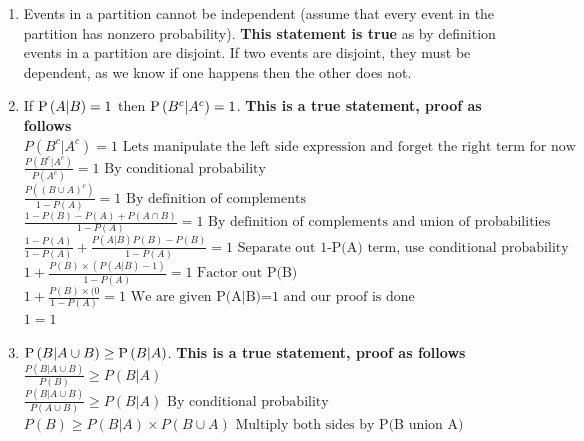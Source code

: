 \documentclass[12pt,twoside]{article}
\begin{document}
\begin{enumerate}
\begin{enumerate}
\item Events in a partition cannot be independent (assume that every event in the partition has nonzero probability). 
\subitem
\textbf{This statement is true} as by definition events in a partition are disjoint. If two events are disjoint, they must be dependent, as we know if one happens then the other does not.

\break

\item If $\mathrm{P}\left( A | B \right) = 1$ then $\mathrm{P}\left( B^c | A^c \right) = 1$. \textbf{This is a true statement, proof as follows} \\

$
P(B^c|A^c) = 1 \text{ Lets manipulate the left side expression and forget the right term for now}$ \\

$ 
 \frac{P(B^c|A^c)}{P(A^c)} = 1 \text{ By conditional probability}
$\\

$
\frac{P((B \cup A)^c)}{1-P(A)} = 1 \text{ By definition of complements}
$\\

$
\frac{1-P(B) - P(A) + P(A\cap B) }{1-P(A)} = 1 \text{ By definition of complements and union of probabilities}$\\

$
    \frac{1-P(A)}{1-P(A)} + \frac{P(A|B)P(B)-P(B)}{1-P(A)} = 1 \text{ Separate out 1-P(A) term, use conditional probability}
$ \\

$
1 + \frac{P(B)\times (P(A|B)-1)}{1-P(A)}= 1 \text{ Factor out P(B)}
$\\

$
1 + \frac{P(B)\times (0}{1-P(A)}= 1 \text{ We are given P(A|B)=1 and our proof is done}
$\\

$
 1 = 1 
$

\item $\mathrm{P}\left( B | A\cup B \right) \geq \mathrm{P}\left( B | A \right) $. \textbf{This is a true statement, proof as follows}
\subitem
$
    \frac{P(B|A\cup B)}{P(B)} \geq P(B|A)
$\\

$
    \frac{P(B|A\cup B)}{P(A\cup B)} \geq P(B|A) \text{ By conditional probability}
$\\

$
    {P(B)} \geq P(B|A) \times P(B\cup A) \text{ Multiply both sides by P(B union A)}
$\\


\end{enumerate}
\end{enumerate}
\end{document}
